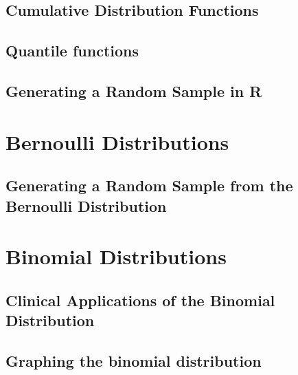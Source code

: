 \documentclass[
]{book}
\begin{document}
\hypertarget{sec:CumDist}{%
\subsection{Cumulative Distribution Functions}\label{sec:CumDist}}

\hypertarget{sec:Quantile}{%
\subsection{Quantile functions}\label{sec:Quantile}}

\hypertarget{generating-a-random-sample-in-r}{%
\subsection{Generating a Random Sample in R}\label{generating-a-random-sample-in-r}}

\hypertarget{sec:BernoulliDist}{%
\section{Bernoulli Distributions}\label{sec:BernoulliDist}}

\hypertarget{generating-a-random-sample-from-the-bernoulli-distribution}{%
\subsection{Generating a Random Sample from the Bernoulli Distribution}\label{generating-a-random-sample-from-the-bernoulli-distribution}}

\hypertarget{sec:binomial}{%
\section{Binomial Distributions}\label{sec:binomial}}

\hypertarget{clinical-applications-of-the-binomial-distribution}{%
\subsection{Clinical Applications of the Binomial Distribution}\label{clinical-applications-of-the-binomial-distribution}}

\hypertarget{graphing-the-binomial-distribution}{%
\subsection{Graphing the binomial distribution}\label{graphing-the-binomial-distribution}}
\end{document}
